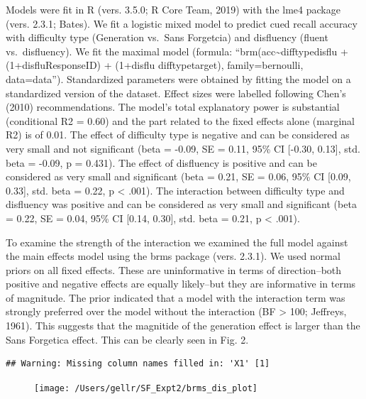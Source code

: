 \documentclass[pdf]{apa6}
\begin{document}
Models were fit in R (vers. 3.5.0; R Core Team, 2019) with the lme4 package (vers. 2.3.1; Bates). We fit a logistic mixed model to predict cued recall accuracy with difficulty type (Generation vs.~Sans Forgetcia) and disfluency (fluent vs.~disfluency). We fit the maximal model (formula: \enquote{brm(acc\textasciitilde{}difftypedisflu + (1+disflu\textbar{}ResponseID) + (1+disflu difftype\textbar{}target), family=bernoulli, data=data}). Standardized parameters were obtained by fitting the model on a standardized version of the dataset. Effect sizes were labelled following Chen's (2010) recommendations. The model's total explanatory power is substantial (conditional R2 = 0.60) and the part related to the fixed effects alone (marginal R2) is of 0.01. The effect of difficulty type is negative and can be considered as very small and not significant (beta = -0.09, SE = 0.11, 95\% CI {[}-0.30, 0.13{]}, std. beta = -0.09, p = 0.431). The effect of disfluency is positive and can be considered as very small and significant (beta = 0.21, SE = 0.06, 95\% CI {[}0.09, 0.33{]}, std. beta = 0.22, p \textless{} .001). The interaction between difficulty type and disfluency was positive and can be considered as very small and significant (beta = 0.22, SE = 0.04, 95\% CI {[}0.14, 0.30{]}, std. beta = 0.21, p \textless{} .001).

To examine the strength of the interaction we examined the full model against the main effects model using the brms package (vers. 2.3.1). We used normal priors on all fixed effects. These are uninformative in terms of direction--both positive and negative effects are equally likely--but they are informative in terms of magnitude. The prior indicated that a model with the interaction term was strongly preferred over the model without the interaction (BF \textgreater{} 100; Jeffreys, 1961). This suggests that the magnitide of the generation effect is larger than the Sans Forgetica effect. This can be clearly seen in Fig. 2.

\begin{verbatim}
## Warning: Missing column names filled in: 'X1' [1]
\end{verbatim}

\begin{figure}

{\centering \texttt{[image: /Users/gellr/SF\_Expt2/brms\_dis\_plot]} 

}

\caption{ }\label{fig:unnamed-chunk-2}
\end{figure}
\end{document}
